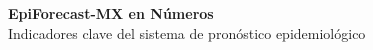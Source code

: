 \documentclass[12pt, letterpaper]{article}
\begin{document}
\newpage

\tableofcontents
\newpage
\listoffigures
\listoftables
\newpage

\thispagestyle{empty}
\vspace*{1cm}
\begin{center}
{\color{teal}\fontsize{22}{28}\selectfont\bfseries EpiForecast-MX en Números}\\[0.3cm]
{\color{coolgray}\normalsize Indicadores clave del sistema de pronóstico epidemiológico}
\end{center}

\vspace{1.0cm}
\end{document}
